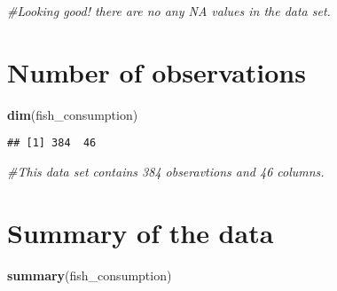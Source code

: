 \documentclass[
]{article}
\newenvironment{Shaded}{\begin{snugshade}}{\end{snugshade}}
\newcommand{\CommentTok}[1]{\textcolor[rgb]{0.56,0.35,0.01}{\textit{#1}}}
\newcommand{\FunctionTok}[1]{\textcolor[rgb]{0.13,0.29,0.53}{\textbf{#1}}}
\newcommand{\NormalTok}[1]{#1}
\begin{document}
\begin{Shaded}
\begin{Highlighting}[]
\CommentTok{\#Looking good! there are no any NA values in the data set. }
\end{Highlighting}
\end{Shaded}

\hypertarget{number-of-observations}{%
\section{Number of observations}\label{number-of-observations}}

\begin{Shaded}
\begin{Highlighting}[]
\FunctionTok{dim}\NormalTok{(fish\_consumption)}
\end{Highlighting}
\end{Shaded}

\begin{verbatim}
## [1] 384  46
\end{verbatim}

\begin{Shaded}
\begin{Highlighting}[]
\CommentTok{\#This data set contains 384 obseravtions and 46 columns.}
\end{Highlighting}
\end{Shaded}

\hypertarget{summary-of-the-data}{%
\section{Summary of the data}\label{summary-of-the-data}}

\begin{Shaded}
\begin{Highlighting}[]
\FunctionTok{summary}\NormalTok{(fish\_consumption)}
\end{Highlighting}
\end{Shaded}
\end{document}
